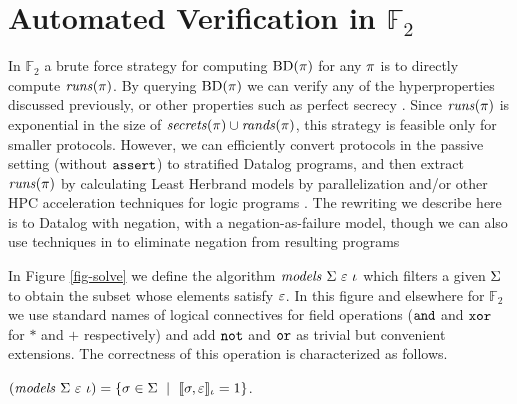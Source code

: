 \section{Automated Verification in $\mathbb{F}_2$}
\label{section-bruteforce}

In $\mathbb{F}_2$ a brute force strategy for computing
$\mathrm{BD}(\pi)$ for any $\pi$ is to directly compute
$\mathit{runs}(\pi)$. By querying $\mathrm{BD}(\pi)$ we can verify any of the
hyperproperties discussed previously, or other properties such as
perfect secrecy \cite{XXX}.  Since $\mathit{runs}(\pi)$ is exponential in
the size of $\mathit{secrets}(\pi) \cup \mathit{rands}(\pi)$, this strategy is
feasible only for smaller protocols. However, we can efficiently
convert protocols in the passive setting (without $\texttt{assert}$) to
stratified Datalog programs, and then extract $\mathit{runs}(\pi)$ by
calculating Least Herbrand models by parallelization and/or other HPC
acceleration techniques for logic programs \cite{aspis2018linear}.
The rewriting we describe here is to Datalog with negation, with a
negation-as-failure model, though we can also use techniques in
\cite{sakama2017linear} to eliminate negation from resulting programs

In Figure \ref{fig-solve} we define the algorithm
$\mathit{models}\ \Sigma\ \varepsilon\ \iota$ which filters a given $\Sigma$ to obtain the
subset whose elements satisfy $\varepsilon$. In this figure and elsewhere for
$\mathbb{F}_2$ we use standard names of logical connectives
for field operations ($\texttt{and}$ and $\texttt{xor}$ for $*$ and $+$ respectively) and
add $\texttt{not}$ and $\texttt{or}$ as trivial but convenient extensions. The correctness
of this operation is characterized as follows.
\begin{lemma}
  \label{lemma-solves}
  $(\mathit{models}\ \Sigma\ \varepsilon\ \iota) = \{ \sigma \in \Sigma \ \mid\ \llbracket \sigma,\varepsilon \rrbracket_{\iota} = 1 \}$.
\end{lemma}

\solvefig

\begin{comment}
We immediately note that $\runs(\prog)$ can be obtained by a left-folding
of $\solvealg$ across $\prog$. 
\begin{lemma}
  \label{lemma-cruns}
  Given $\prog$ where $\iov(\prog) = S \cup V \cup O$ and $\flips(\prog) = R$. Define:
  \begin{eqnarray*}
    {tt}\ \ \stores\ (\xassign{x}{\be}{\cid}) &\defeq& \begin{array}{l}
      \mathrm{let}\ \stores' = \solve{\stores}{\be} \ \mathrm{in}\\
      \ \ \{\extend{\store}{\view{\cid}{w}}{1} \mid \store \in \stores' \}\ \cup\\
      \ \ \{\extend{\store}{\view{\cid}{w}}{0} \mid \store \in \stores - \stores' \}\end{array}\\[2mm]
    \cruns(\prog) &\defeq& \mathit{foldl}\ {tt}\ \mems(S \cup F)\ \prog
  \end{eqnarray*}
  Then $\cruns(\prog) = \runs(\prog)$.
\end{lemma}
\end{comment}


